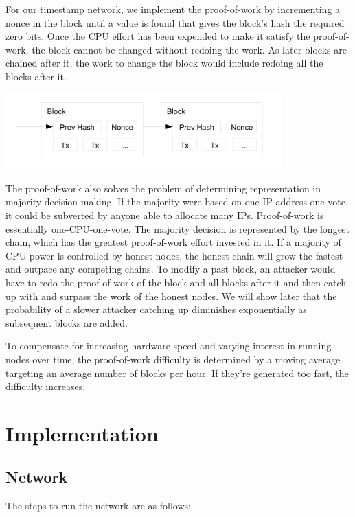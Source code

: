 \documentclass[10pt]{book}
\begin{document}
For our timestamp network, we implement the proof-of-work by incrementing a nonce in the block until a value is found that gives the block's hash the required zero bits.
Once the CPU effort has been expended to make it satisfy the proof-of-work, the block cannot be changed without redoing the work.
As later blocks are chained after it, the work to change the block would include redoing all the blocks after it.

\begin{center}
\includegraphics[width=0.8\textwidth]{./images/3.png}
\end{center}

The proof-of-work also solves the problem of determining representation in majority decision making.
If the majority were based on one-IP-address-one-vote, it could be subverted by anyone able to allocate many IPs.
Proof-of-work is essentially one-CPU-one-vote.
The majority decision is represented by the longest chain, which has the greatest proof-of-work effort invested in it.
If a majority of CPU power is controlled by honest nodes, the honest chain will grow the fastest and outpace any competing chains.
To modify a past block, an attacker would have to redo the proof-of-work of the block and all blocks after it and then catch up with and surpass the work of the honest nodes.
We will show later that the probability of a slower attacker catching up diminishes exponentially as subsequent blocks are added.

To compensate for increasing hardware speed and varying interest in running nodes over time, the proof-of-work difficulty is determined by a moving average targeting an average number of blocks per hour.
If they're generated too fast, the difficulty increases.

\part{Implementation}
\chapter{Network}
The steps to run the network are as follows:
\end{document}
